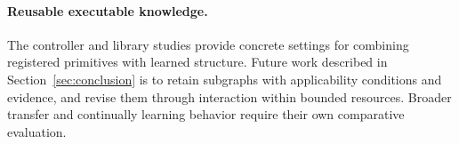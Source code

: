\paragraph{Reusable executable knowledge.}
\label{app:intended_use}
The controller and library studies provide concrete settings for combining
registered primitives with learned structure. Future work described in
Section~\ref{sec:conclusion} is to retain subgraphs with applicability conditions
and evidence, and revise them through interaction within bounded resources.
Broader transfer and continually learning behavior require their own
comparative evaluation.
